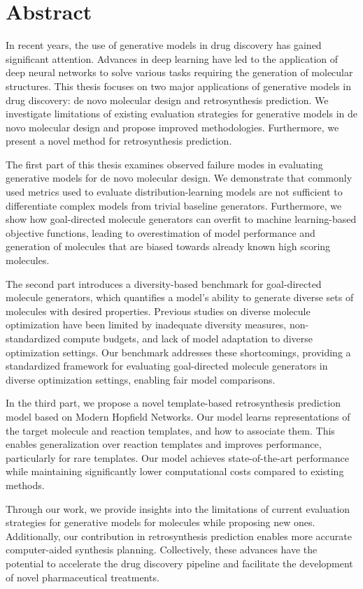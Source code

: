 
{%
\chapter*{Abstract}
In recent years, the use of generative models in drug discovery has gained significant attention.
Advances in deep learning have led to the application of deep neural networks to solve various tasks
requiring the generation of molecular structures. This thesis focuses on two major applications of
generative models in drug discovery: de novo molecular design and retrosynthesis prediction. We investigate
limitations of existing evaluation strategies for generative models in de novo molecular design and
propose improved methodologies. Furthermore, we present a novel method for retrosynthesis
prediction.

The first part of this thesis examines observed failure modes in evaluating generative models for de
novo molecular design. We demonstrate that commonly used metrics used to evaluate
distribution-learning models are not sufficient to differentiate complex models from trivial
baseline generators. Furthermore, we show how goal-directed molecule generators can overfit to
machine learning-based objective functions, leading to overestimation of model performance and
generation of molecules that are biased towards already known high scoring molecules.

The second part introduces a diversity-based benchmark for goal-directed molecule generators, which
quantifies a model's ability to generate diverse sets of molecules with desired properties. Previous
studies on diverse molecule optimization have been limited by inadequate diversity measures,
non-standardized compute budgets, and lack of model adaptation to diverse optimization settings. Our
benchmark addresses these shortcomings, providing a standardized framework for evaluating
goal-directed molecule generators in diverse optimization settings, enabling fair model
comparisons.

In the third part, we propose a novel template-based retrosynthesis prediction model based on Modern
Hopfield Networks. Our model learns representations of the target molecule and reaction templates,
and how to associate them. This enables generalization over reaction templates and improves
performance, particularly for rare templates. Our model achieves state-of-the-art performance while
maintaining significantly lower computational costs compared to existing methods.

Through our work, we provide insights into the limitations of current evaluation strategies for
generative models for molecules while proposing new ones. Additionally, our
contribution in retrosynthesis prediction enables more accurate computer-aided synthesis planning.
Collectively, these advances have the potential to accelerate the drug discovery pipeline and
facilitate the development of novel pharmaceutical treatments.
}%